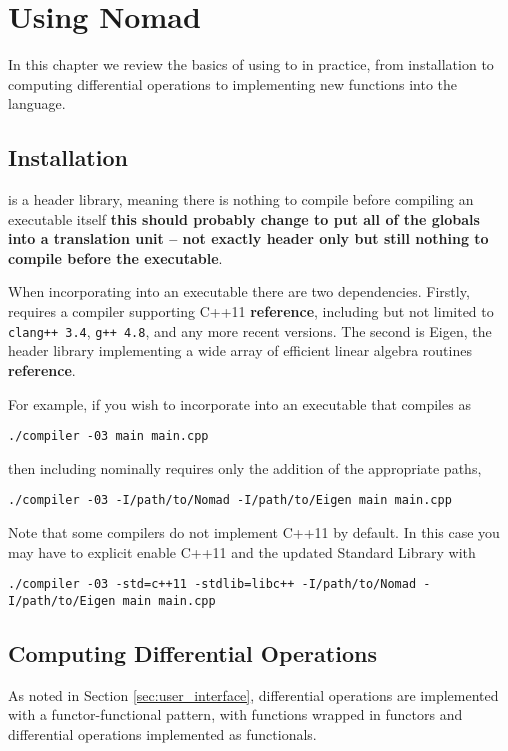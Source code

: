 \chapter{Using Nomad}

In this chapter we review the basics of using \nomad to in practice, 
from installation to computing differential operations to implementing
new functions into the language.

\section{Installation}

\nomad is a header library, meaning there is nothing to compile
before compiling an executable itself \textbf{this should probably change
to put all of the globals into a translation unit -- not exactly header
only but still nothing to compile before the executable}.

When incorporating \nomad into an executable there are two
dependencies.  Firstly, \nomad requires a compiler supporting C++11 
\textbf{reference}, including but not limited to \verb|clang++ 3.4|,
\verb|g++ 4.8|, and any more recent versions.  The second is Eigen,
the header library implementing a wide array of efficient linear algebra
routines \textbf{reference}.

For example, if you wish to incorporate \nomad into an executable
that compiles as
%
\begin{verbatim}
./compiler -03 main main.cpp
\end{verbatim}
%
then including \nomad nominally requires only the addition of the 
appropriate paths,
%
\begin{verbatim}
./compiler -03 -I/path/to/Nomad -I/path/to/Eigen main main.cpp
\end{verbatim}
%
Note that some compilers do not implement C++11 by default.  In
this case you may have to explicit enable C++11 and the updated
Standard Library with
%
\begin{verbatim}
./compiler -03 -std=c++11 -stdlib=libc++ -I/path/to/Nomad -I/path/to/Eigen main main.cpp
\end{verbatim}

\section{Computing Differential Operations}

As noted in Section \ref{sec:user_interface}, differential operations are
implemented with a functor-functional pattern, with functions wrapped
in functors and differential operations implemented as functionals.

